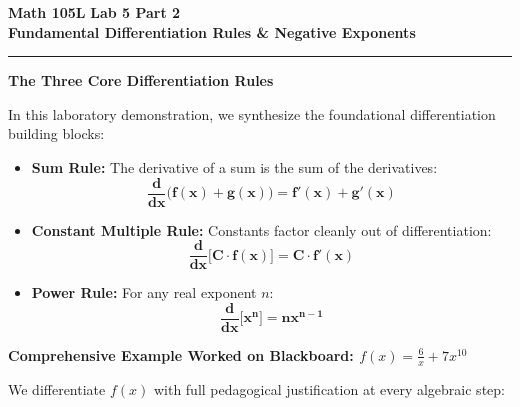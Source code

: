 \documentclass[10.5pt]{article}
\begin{document}
\noindent \textbf{\large Math 105L} \hfill \textbf{\large Lab 5 Part 2}\\[1pt]
{\textbf{\Large Fundamental Differentiation Rules \& Negative Exponents}}\\[-5pt]
\rule{\textwidth}{1.2pt}

\vspace{0.03in}

\textbf{\large The Three Core Differentiation Rules}

In this laboratory demonstration, we synthesize the foundational differentiation building blocks:

\begin{tcolorbox}[colback=boxbg, colframe=boxframe, boxrule=0.8pt, arc=3pt, left=8pt, right=8pt, top=4pt, bottom=4pt]
\begin{itemize}[leftmargin=1.2em, topsep=1pt, itemsep=3pt]
  \item \textbf{Sum Rule:} The derivative of a sum is the sum of the derivatives:
  \[
    \mathbf{\frac{d}{dx}\big(f(x) + g(x)\big) = f'(x) + g'(x)}
  \]
  \item \textbf{Constant Multiple Rule:} Constants factor cleanly out of differentiation:
  \[
    \mathbf{\frac{d}{dx}\big[C \cdot f(x)\big] = C \cdot f'(x)}
  \]
  \item \textbf{Power Rule:} For any real exponent $n$:
  \[
    \mathbf{\frac{d}{dx}\big[x^n\big] = n x^{n-1}}
  \]
\end{itemize}
\end{tcolorbox}

\vspace{0.04in}

\textbf{\large Comprehensive Example Worked on Blackboard: $f(x) = \frac{6}{x} + 7x^{10}$}

We differentiate $f(x)$ with full pedagogical justification at every algebraic step:
\end{document}
